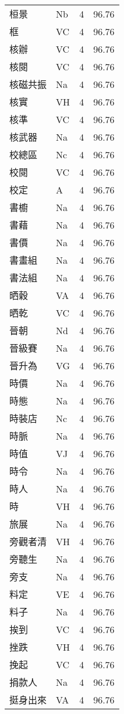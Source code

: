 \documentclass[twocolumn]{book}
\begin{document}
\begin{supertabular}{llrr}
桓景 & Nb & 4 &  96.76\\
框 & VC & 4 &  96.76\\
核辦 & VC & 4 &  96.76\\
核閱 & VC & 4 &  96.76\\
核磁共振 & Na & 4 &  96.76\\
核實 & VH & 4 &  96.76\\
核準 & VC & 4 &  96.76\\
核武器 & Na & 4 &  96.76\\
校總區 & Nc & 4 &  96.76\\
校閱 & VC & 4 &  96.76\\
校定 & A & 4 &  96.76\\
書櫥 & Na & 4 &  96.76\\
書藉 & Na & 4 &  96.76\\
書價 & Na & 4 &  96.76\\
書畫組 & Na & 4 &  96.76\\
書法組 & Na & 4 &  96.76\\
晒穀 & VA & 4 &  96.76\\
晒乾 & VC & 4 &  96.76\\
晉朝 & Nd & 4 &  96.76\\
晉級賽 & Na & 4 &  96.76\\
晉升為 & VG & 4 &  96.76\\
時價 & Na & 4 &  96.76\\
時態 & Na & 4 &  96.76\\
時裝店 & Nc & 4 &  96.76\\
時脈 & Na & 4 &  96.76\\
時值 & VJ & 4 &  96.76\\
時令 & Na & 4 &  96.76\\
時人 & Na & 4 &  96.76\\
時 & VH & 4 &  96.76\\
旅展 & Na & 4 &  96.76\\
旁觀者清 & VH & 4 &  96.76\\
旁聽生 & Na & 4 &  96.76\\
旁支 & Na & 4 &  96.76\\
料定 & VE & 4 &  96.76\\
料子 & Na & 4 &  96.76\\
挨到 & VC & 4 &  96.76\\
挫跌 & VH & 4 &  96.76\\
挽起 & VC & 4 &  96.76\\
捐款人 & Na & 4 &  96.76\\
挺身出來 & VA & 4 &  96.76\\

\end{supertabular}
\end{document}
